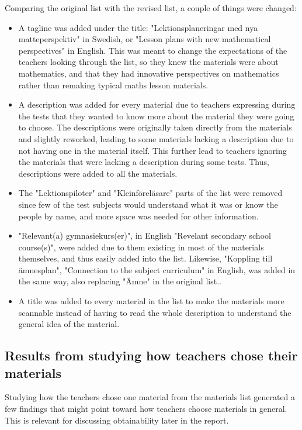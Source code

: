 Comparing the original list with the revised list, a couple of things were changed:
\begin{itemize}
	\item A tagline was added under the title: "Lektionsplaneringar med nya matteperspektiv" in Swedish, or "Lesson plans with new mathematical perspectives" in English. This was meant to change the expectations of the teachers looking through the list, so they knew the materials were about mathematics, and that they had innovative perspectives on mathematics rather than remaking typical maths lesson materials.
	\item A description was added for every material due to teachers expressing during the tests that they wanted to know more about the material they were going to choose. The descriptions were originally taken directly from the materials and slightly reworked, leading to some materials lacking a description due to not having one in the material itself. This further lead to teachers ignoring the materials that were lacking a description during some tests. Thus, descriptions were added to all the materials.
	\item The "Lektionspiloter" and "Kleinföreläsare" parts of the list were removed since few of the test subjects would understand what it was or know the people by name, and more space was needed for other information.
	\item "Relevant(a) gymnasiekurs(er)", in English "Revelant secondary school course(s)", were added due to them existing in most of the materials themselves, and thus easily added into the list. Likewise, "Koppling till ämnesplan", "Connection to the subject curriculum" in English, was added in the same way, also replacing "Ämne" in the original list..
	\item A title was added to every material in the list to make the materials more scannable instead of having to read the whole description to understand the general idea of the material.
\end{itemize}

\subsection{Results from studying how teachers chose their materials}

Studying how the teachers chose one material from the materials list generated a few findings that might point toward how teachers choose materials in general. This is relevant for discussing obtainability later in the report.

